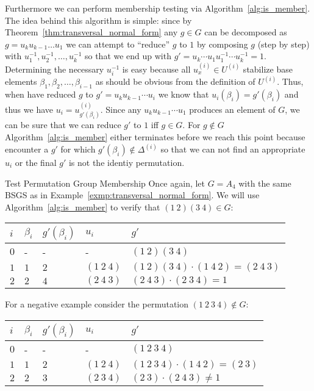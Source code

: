 Furthermore we can perform membership testing via
Algorithm~\ref{alg:is_member}. The idea behind this algorithm is simple: since
by Theorem~\ref{thm:transversal_normal_form} any $g \in G$ can be decomposed as
$g = u_k u_{k-1} \dots u_1$ we can attempt to ``reduce'' $g$ to $1$ by
composing $g$ (step by step) with $u_1^{-1}, u_2^{-1}, \dots, u_k^{-1}$ so that
we end up with $g' = u_k \cdots u_1 u_1^{-1} \cdots u_k^{-1} = 1$.
%
Determining the necessary $u_i^{-1}$ is easy because
all $u_x^{(i)} \in U^{(i)}$ stabilize base elements $\beta_1, \beta_2, \dots,
\beta_{i-1}$ as should be obvious from the definition of $U^{(i)}$. Thus, when
have reduced $g$ to $g' = u_k u_{k-1} \cdots u_i$ we know that $u_i(\beta_i) =
g'(\beta_i)$ and thus we have $u_i = u_{g'(\beta_i)}^{(i)}$.
%
Since any $u_k u_{k-1} \cdots u_1$ produces an element of $G$, we can be
sure that we can reduce $g'$ to $1$ iff $g \in G$. For $g \notin G$
Algorithm~\ref{alg:is_member} either terminates before we reach this point
because encounter a $g'$ for which $g'(\beta_i) \notin
\Delta^{(i)}$ so that we can not find an appropriate $u_i$ or the final $g'$ is
not the identiy permutation.

\begin{exmp}{Test Permutation Group Membership}
  Once again, let $G = A_4$ with the same BSGS as in
  Example~\ref{exmp:transversal_normal_form}. We will use
  Algorithm~\ref{alg:is_member} to verify that $(1\ 2)(3\ 4) \in G$:
  \begin{center}
    \begin{tabular}{l|l|l|l|l}
      \toprule
      $i$ & $\beta_i$ & $g'(\beta_i)$ & $u_i$ & $g'$ \\
      \midrule
      $0$ & -   & -   & -            & $(1\ 2)(3\ 4)$                             \\
      $1$ & $1$ & $2$ & $(1\ 2\ 4)$  & $(1\ 2)(3\ 4) \cdot (1\ 4\ 2) = (2\ 4\ 3)$ \\
      $2$ & $2$ & $4$ & $(2\ 4\ 3)$  & $(2\ 4\ 3) \cdot (2\ 3\ 4) = 1$            \\
      \bottomrule
    \end{tabular}
  \end{center}
  For a negative example consider the permutation $(1\ 2\ 3\ 4) \notin G$:
  \begin{center}
    \begin{tabular}{l|l|l|l|l}
      \toprule
      $i$ & $\beta_i$ & $g'(\beta_i)$ & $u_i$ & $g'$ \\
      \midrule
      $0$ & -   & -   & -            & $(1\ 2\ 3\ 4)$                          \\
      $1$ & $1$ & $2$ & $(1\ 2\ 4)$  & $(1\ 2\ 3\ 4) \cdot (1\ 4\ 2) = (2\ 3)$ \\
      $2$ & $2$ & $3$ & $(2\ 3\ 4)$  & $(2\ 3) \cdot (2\ 4\ 3) \ne 1$          \\
      \bottomrule
    \end{tabular}
  \end{center}
\end{exmp}

